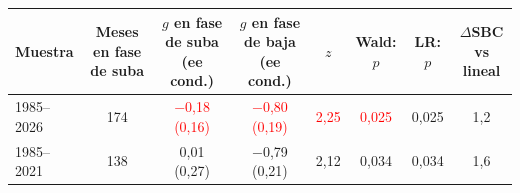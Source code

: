 \begin{tabular}{lccccccc}
\toprule
Muestra & Meses en fase de suba & $g$ en fase de suba (ee cond.) & $g$ en fase de baja (ee cond.) & $z$ & Wald: $p$ & LR: $p$ & $\Delta$SBC vs lineal
\\ \midrule
1985--2026 & 174 & \textcolor{red}{\ensuremath{-}0{,}18 (0{,}16)} & \textcolor{red}{\ensuremath{-}0{,}80 (0{,}19)} & \textcolor{red}{2{,}25} & \textcolor{red}{0{,}025} & 0{,}025 & 1{,}2 \\
1985--2021 & 138 & 0{,}01 (0{,}27) & \ensuremath{-}0{,}79 (0{,}21) & 2{,}12 & 0{,}034 & 0{,}034 & 1{,}6 \\
\bottomrule
\end{tabular}
